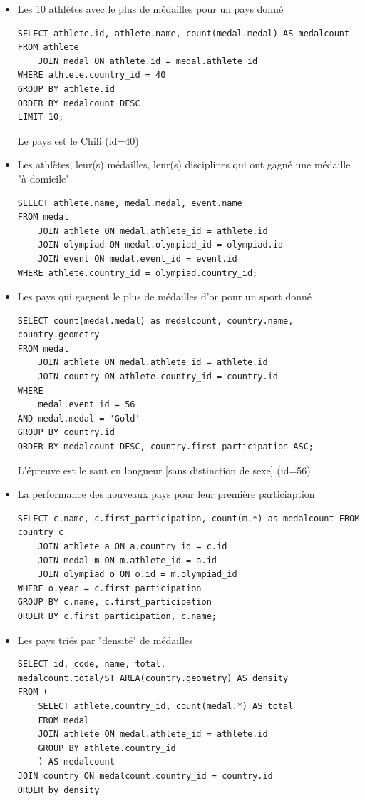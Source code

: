 \documentclass{article}
\begin{document}
\begin{itemize}

\item Les 10 athlètes avec le plus de médailles pour un pays donné
\begin{verbatim}
SELECT athlete.id, athlete.name, count(medal.medal) AS medalcount
FROM athlete
    JOIN medal ON athlete.id = medal.athlete_id
WHERE athlete.country_id = 40
GROUP BY athlete.id
ORDER BY medalcount DESC
LIMIT 10;
\end{verbatim}

{\footnotesize Le pays est le Chili (id=40)}

\item Les athlètes, leur(s) médailles, leur(s) disciplines qui ont gagné une médaille "à domicile"
\begin{verbatim}
SELECT athlete.name, medal.medal, event.name
FROM medal
    JOIN athlete ON medal.athlete_id = athlete.id
    JOIN olympiad ON medal.olympiad_id = olympiad.id
    JOIN event ON medal.event_id = event.id
WHERE athlete.country_id = olympiad.country_id;
\end{verbatim}

\item Les pays qui gagnent le plus de médailles d'or pour un sport donné
\begin{verbatim}
SELECT count(medal.medal) as medalcount, country.name, country.geometry
FROM medal
    JOIN athlete ON medal.athlete_id = athlete.id
    JOIN country ON athlete.country_id = country.id
WHERE
    medal.event_id = 56
AND medal.medal = 'Gold'
GROUP BY country.id
ORDER BY medalcount DESC, country.first_participation ASC;
\end{verbatim}

{\footnotesize L'épreuve est le saut en longueur [sans distinction de sexe] (id=56)}

\item La performance des nouveaux pays pour leur première particiaption
\begin{verbatim}
SELECT c.name, c.first_participation, count(m.*) as medalcount FROM country c
    JOIN athlete a ON a.country_id = c.id
    JOIN medal m ON m.athlete_id = a.id
    JOIN olympiad o ON o.id = m.olympiad_id
WHERE o.year = c.first_participation
GROUP BY c.name, c.first_participation
ORDER BY c.first_participation, c.name;
\end{verbatim}

\item Les pays triés par "densité" de médailles
\begin{verbatim}
SELECT id, code, name, total, medalcount.total/ST_AREA(country.geometry) AS density
FROM (
    SELECT athlete.country_id, count(medal.*) AS total
    FROM medal
    JOIN athlete ON medal.athlete_id = athlete.id
    GROUP BY athlete.country_id
    ) AS medalcount
JOIN country ON medalcount.country_id = country.id
ORDER by density
\end{verbatim}

\end{itemize}
\end{document}
